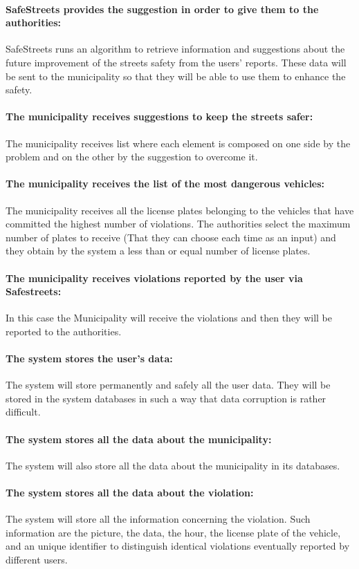 \documentclass[titlepage]{article}
\begin{document}
\paragraph{SafeStreets provides the suggestion in order to give them to the authorities: }
SafeStreets runs an algorithm to retrieve information and suggestions about the future improvement of the streets safety from the users' reports. These data will be sent to the municipality so that they will be able to use them to enhance the safety.
\paragraph{The municipality receives suggestions to keep the streets safer: }
The municipality receives list where each element is composed on one side by the problem and on the other by the suggestion to overcome it.
\paragraph{The municipality receives the list of the most 			dangerous vehicles: }
The municipality receives all the license plates belonging to the vehicles that have committed the highest number of violations. The authorities select the maximum number of plates to receive (That they can choose each time as an input) and they obtain by the system a less than or equal number of license plates.
\paragraph{The municipality receives violations reported by the user via Safestreets:} In this case the Municipality will receive the violations and then they will be reported to the authorities.
\paragraph{The system stores the user's data:}
The system will store permanently and safely all the user data. They will be stored in the system databases in such a way that data corruption is rather difficult.
\paragraph{The system stores all the data about the 					municipality:}
The system will also store all the data about the municipality in its databases.
\paragraph{The system stores all the data about the violation: }
The system will store all the information concerning the violation. Such information are the picture, the data, the hour, the license plate of the vehicle, and an unique identifier to distinguish identical violations eventually reported by different users.
\end{document}
